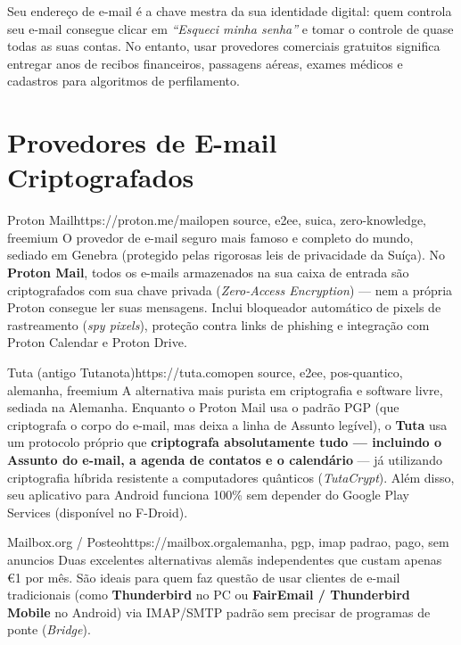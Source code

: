 \documentclass{pousadaguide}
\begin{document}
Seu endereço de e-mail é a chave mestra da sua identidade digital: quem controla seu e-mail consegue clicar em \emph{``Esqueci minha senha''} e tomar o controle de quase todas as suas contas. No entanto, usar provedores comerciais gratuitos significa entregar anos de recibos financeiros, passagens aéreas, exames médicos e cadastros para algoritmos de perfilamento.

\section{Provedores de E-mail Criptografados}

\begin{ferramenta}[goat,logo=protonmail]{Proton Mail}{https://proton.me/mail}{open source, e2ee, suica, zero-knowledge, freemium}
O provedor de e-mail seguro mais famoso e completo do mundo, sediado em Genebra (protegido pelas rigorosas leis de privacidade da Suíça). No \textbf{Proton Mail}, todos os e-mails armazenados na sua caixa de entrada são criptografados com sua chave privada (\emph{Zero-Access Encryption}) — nem a própria Proton consegue ler suas mensagens. Inclui bloqueador automático de pixels de rastreamento (\emph{spy pixels}), proteção contra links de phishing e integração com Proton Calendar e Proton Drive. 
\end{ferramenta}

\begin{ferramenta}[goat,logo=tuta]{Tuta (antigo Tutanota)}{https://tuta.com}{open source, e2ee, pos-quantico, alemanha, freemium}
A alternativa mais purista em criptografia e software livre, sediada na Alemanha. Enquanto o Proton Mail usa o padrão PGP (que criptografa o corpo do e-mail, mas deixa a linha de Assunto legível), o \textbf{Tuta} usa um protocolo próprio que \textbf{criptografa absolutamente tudo — incluindo o Assunto do e-mail, a agenda de contatos e o calendário} — já utilizando criptografia híbrida resistente a computadores quânticos (\emph{TutaCrypt}). Além disso, seu aplicativo para Android funciona 100\% sem depender do Google Play Services (disponível no F-Droid). 
\end{ferramenta}

\begin{ferramenta}[recomendado,logo=mailbox]{Mailbox.org / Posteo}{https://mailbox.org}{alemanha, pgp, imap padrao, pago, sem anuncios}
Duas excelentes alternativas alemãs independentes que custam apenas €1 por mês. São ideais para quem faz questão de usar clientes de e-mail tradicionais (como \textbf{Thunderbird} no PC ou \textbf{FairEmail / Thunderbird Mobile} no Android) via IMAP/SMTP padrão sem precisar de programas de ponte (\emph{Bridge}). 
\end{ferramenta}
\end{document}
